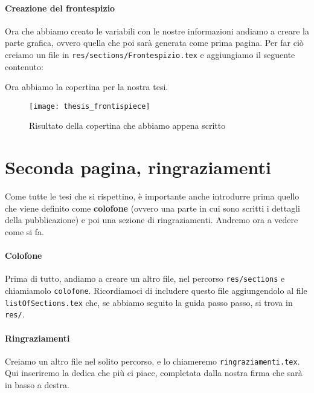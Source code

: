 

\paragraph*{Creazione del frontespizio} Ora che abbiamo creato le variabili con
le nostre informazioni andiamo a creare la parte grafica, ovvero quella che poi
sarà generata come prima pagina. Per far ciò creiamo un file in
\texttt{res/sections/Frontespizio.tex} e aggiungiamo il seguente contenuto:



\noindent Ora abbiamo la copertina per la nostra tesi.

\begin{figure}[t]
 \centering
 \texttt{[image: thesis\_frontispiece]}
 \caption[Frontespizio tesi]{Risultato della copertina che abbiamo appena
scritto}
 \label{img:thesis_frontispiece}
\end{figure}


\section{Seconda pagina, ringraziamenti}
Come tutte le tesi che si rispettino, è importante anche introdurre prima
quello che viene definito come \textbf{colofone} (ovvero una parte in cui sono
scritti i dettagli della pubblicazione) e poi una sezione di ringraziamenti.
Andremo ora a vedere come si fa.
\paragraph*{Colofone} Prima di tutto, andiamo a creare un altro
file, nel percorso \texttt{res/sections} e chiamiamolo \texttt{colofone}.
Ricordiamoci di includere questo file aggiungendolo al file
\texttt{listOfSections.tex} che, se abbiamo seguito la guida passo passo, si
trova in \texttt{res/}.



\paragraph*{Ringraziamenti} Creiamo un altro file nel solito percorso, e lo
chiameremo \texttt{ringraziamenti.tex}. Qui inseriremo la dedica che più ci
piace, completata dalla nostra firma che sarà in basso a destra.



